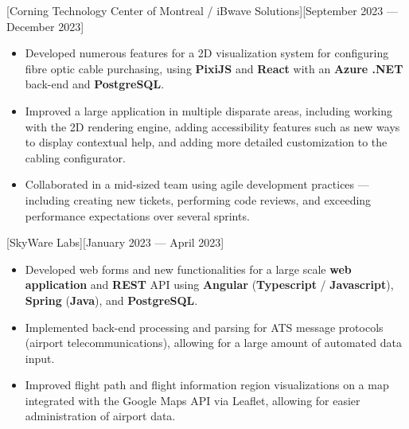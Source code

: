 \documentclass{article}
\begin{document}
\vspace*{\fill}


[Corning Technology Center of Montreal /
	iBwave Solutions][September 2023 --- December 2023]

\begin{itemize}
	\item Developed numerous features for a 2D visualization system for
	      configuring fibre optic cable purchasing, using \textbf{PixiJS} and
	      \textbf{React} with an \textbf{Azure .NET} back-end and
	      \textbf{PostgreSQL}.
	\item Improved a large application in multiple disparate areas, including
	      working with the 2D rendering engine, adding accessibility features
	      such as new ways to display contextual help, and adding more detailed
	      customization to the cabling configurator.
	\item Collaborated in a mid-sized team using agile development practices ---
	      including creating new tickets, performing code reviews, and exceeding
	      performance expectations over several sprints.
\end{itemize}

[SkyWare Labs][January 2023 --- April 2023]

\begin{itemize}
	\item Developed web forms and new functionalities for a large scale
	      \textbf{web application} and \textbf{REST} API using
	      \textbf{Angular} (\textbf{Typescript} / \textbf{Javascript}),
	      \textbf{Spring} (\textbf{Java}), and \textbf{PostgreSQL}.
	\item Implemented back-end processing and parsing for ATS message protocols
	      (airport telecommunications), allowing for a large amount of automated
	      data input.
	\item Improved flight path and flight information region visualizations on a
	      map integrated with the Google Maps API via Leaflet, allowing for
	      easier administration of airport data.
\end{itemize}



\end{document}
